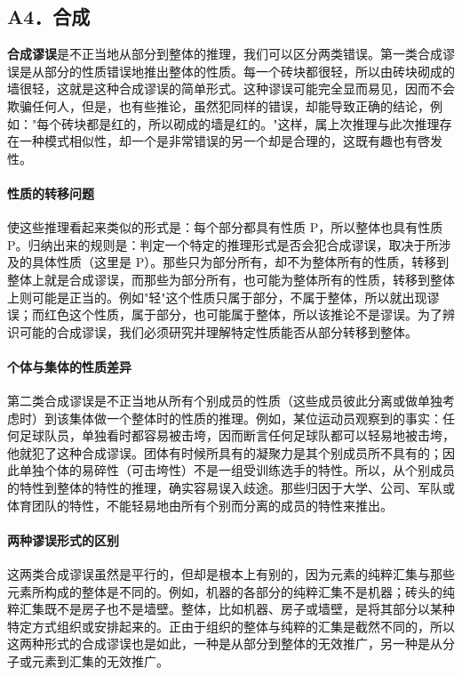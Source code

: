 \subsection{A4．合成}

\textbf{合成谬误}是不正当地从部分到整体的推理，我们可以区分两类错误。第一类合成谬误是从部分的性质错误地推出整体的性质。每一个砖块都很轻，所以由砖块砌成的墙很轻，这就是这种合成谬误的简单形式。这种谬误可能完全显而易见，因而不会欺骗任何人，但是，也有些推论，虽然犯同样的错误，却能导致正确的结论，例如："每个砖块都是红的，所以砌成的墙是红的。"这样，属上次推理与此次推理存在一种模式相似性，却一个是非常错误的另一个却是合理的，这既有趣也有啓发性。

\paragraph{性质的转移问题}
使这些推理看起来类似的形式是：每个部分都具有性质 P，所以整体也具有性质 P。归纳出来的规则是：判定一个特定的推理形式是否会犯合成谬误，取决于所涉及的具体性质（这里是 P）。那些只为部分所有，却不为整体所有的性质，转移到整体上就是合成谬误，而那些为部分所有，也可能为整体所有的性质，转移到整体上则可能是正当的。例如"轻"这个性质只属于部分，不属于整体，所以就出现谬误；而红色这个性质，属于部分，也可能属于整体，所以该推论不是谬误。为了辨识可能的合成谬误，我们必须研究并理解特定性质能否从部分转移到整体。

\paragraph{个体与集体的性质差异}
第二类合成谬误是不正当地从所有个别成员的性质（这些成员彼此分离或做单独考虑时）到该集体做一个整体时的性质的推理。例如，某位运动员观察到的事实：任何足球队员，单独看时都容易被击垮，因而断言任何足球队都可以轻易地被击垮，他就犯了这种合成谬误。团体有时候所具有的凝聚力是其个别成员所不具有的；因此单独个体的易碎性（可击垮性）不是一组受训练选手的特性。所以，从个别成员的特性到整体的特性的推理，确实容易误入歧途。那些归因于大学、公司、军队或体育团队的特性，不能轻易地由所有个别而分离的成员的特性来推出。

\paragraph{两种谬误形式的区别}
这两类合成谬误虽然是平行的，但却是根本上有别的，因为元素的纯粹汇集与那些元素所构成的整体是不同的。例如，机器的各部分的纯粹汇集不是机器；砖头的纯粹汇集既不是房子也不是墙壁。整体，比如机器、房子或墙壁，是将其部分以某种特定方式组织或安排起来的。正由于组织的整体与纯粹的汇集是截然不同的，所以这两种形式的合成谬误也是如此，一种是从部分到整体的无效推广，另一种是从分子或元素到汇集的无效推广。 